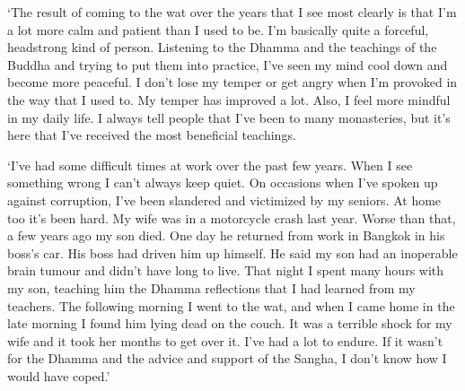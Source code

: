 `The result of coming to the wat over the years that I see most clearly
is that I'm a lot more calm and patient than I used to be. I'm
basically quite a forceful, headstrong kind of person. Listening to the
Dhamma and the teachings of the Buddha and trying to put them into
practice, I've seen my mind cool down and become more peaceful. I don't
lose my temper or get angry when I'm provoked in the way that I used to. 
My temper has improved a lot. Also, I feel more mindful in my daily
life. I always tell people that I've been to many monasteries, but it's
here that I've received the most beneficial teachings. 

`I've had some difficult times at work over the past few years. When I
see something wrong I can't always keep quiet. On occasions when I've
spoken up against corruption, I've been slandered and victimized by my
seniors. At home too it's been hard. My wife was in a motorcycle crash
last year. Worse than that, a few years ago my son died. One day he
returned from work in Bangkok in his boss's car. His boss had driven him
up himself. He said my son had an inoperable brain tumour and didn't
have long to live. That night I spent many hours with my son, teaching
him the Dhamma reflections that I had learned from my teachers. The
following morning I went to the wat, and when I came home in the late
morning I found him lying dead on the couch. It was a terrible shock for
my wife and it took her months to get over it. I've had a lot to endure. 
If it wasn't for the Dhamma and the advice and support of the Sangha, I
don't know how I would have coped.'

